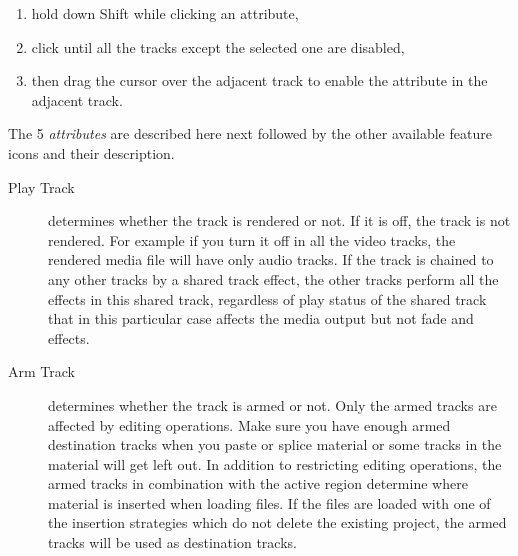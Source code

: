 \begin{enumerate}
\item hold down Shift while clicking an attribute,
\item click until all the tracks except the selected one are
  disabled,
\item then drag the cursor over the adjacent track to enable the
  attribute in the adjacent track.
\end{enumerate}

The 5 \textit{attributes} are described here next followed by the other available feature icons and their description.

\begin{description}
\item[Play Track] determines whether the track is rendered or
  not. If it is off, the track is not rendered.  For example if you
  turn it off in all the video tracks, the rendered media file will
  have only audio tracks.  If the track is chained to any other tracks
  by a shared track effect, the other tracks perform all the effects
  in this shared track, regardless of play status of the shared track
  that in this particular case affects the media output but not fade
  and effects.
\item[Arm Track] determines whether the track is armed or not.
  Only the armed tracks are affected by editing operations. Make sure
  you have enough armed destination tracks when you paste or splice
  material or some tracks in the material will get left out.  In
  addition to restricting editing operations, the armed tracks in
  combination with the active region determine where material is
  inserted when loading files.  If the files are loaded with one of
  the insertion strategies which do not delete the existing project,
  the armed tracks will be used as destination tracks.
\end{description}

